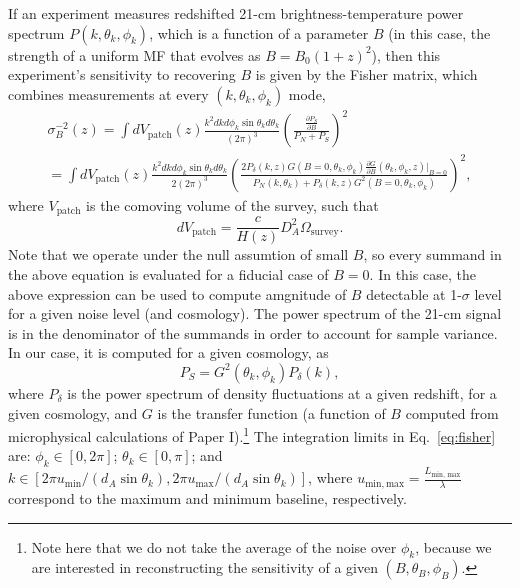 \documentclass[12pt]{paper}
\begin{document}
If an experiment measures redshifted 21-cm brightness-temperature power spectrum $P(k,\theta_k,\phi_k)$, which is a function of a parameter $B$ (in this case, the strength of a uniform MF that evolves as $B=B_0(1+z)^2$), then this experiment's sensitivity to recovering $B$ is given by the Fisher matrix, which combines measurements at every $(k,\theta_k,\phi_k)$ mode,
\begin{equation}
\begin{gathered}
\sigma_B^{-2}(z) = \int dV_\mathrm{patch}(z)
\frac{k^2dk d\phi_k\sin \theta_kd\theta_k}{(2\pi)^3}\left(  \frac{\frac{\partial P_S}{\partial B}}{P_N + P_S }\right)^2 \\
=\int dV_\mathrm{patch}(z)
\frac{k^2dk d\phi_k\sin \theta_kd\theta_k}{2(2\pi)^3}\left( \frac{2P_\delta(k,z)G(B=0,\theta_k,\phi_k)\frac{\partial G}{\partial B}(\theta_k, \phi_k,z)\bigg|_{B=0}}{P_N(k,\theta_k) + P_\delta(k,z)G^2(B=0,\theta_k,\phi_k)} \right)^2,
\end{gathered}
\label{eq:fisher}
\end{equation}
where $V_\mathrm{patch}$ is the comoving volume of the survey, such that
\begin{equation}
dV_\mathrm{patch} = \frac{c}{H(z)}D_A^2\Omega_\mathrm{survey}.
\end{equation}
Note that we operate under the null assumtion of small $B$, so every summand in the above equation is evaluated for a fiducial case of $B=0$. In this case, the above expression can be used to compute amgnitude of $B$ detectable at 1-$\sigma$ level for a given noise level (and cosmology). The power spectrum of the 21-cm signal is in the denominator of the summands in order to account for sample variance. In our case, it is computed for a given cosmology, as
\begin{equation}
P_S = G^2(\theta_k, \phi_k) P_\delta (k),
\label{eq:PS}
\end{equation}
where $P_\delta$ is the power spectrum of density fluctuations at a given redshift, for a given cosmology, and $G$ is the transfer function (a function of $B$ computed from microphysical calculations of Paper I).\footnote{Note here that we do not take the average of the noise over $\phi_k$, because we are interested in reconstructing the sensitivity of a given $(B,\theta_B,\phi_B)$. }
The integration limits in Eq.~\ref{eq:fisher} are: $\phi_k\in[0,2\pi]$; $\theta_k\in [0,\pi]$; and $k\in[2\pi u_\mathrm{min}/(d_A\sin\theta_k),2\pi u_\mathrm{max}/(d_A\sin\theta_k)]$, where $u_\mathrm{min, max}=\frac{L_\text{min, max}}{\lambda}$ correspond to the maximum and minimum baseline, respectively.
\end{document}
